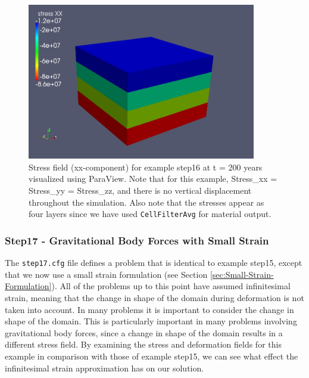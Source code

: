 \begin{figure}
\begin{centering}
\includegraphics[width=10cm]{tutorials/3dhex8/figs/step16-stress_xx-t200}
\par\end{centering}

\caption{Stress field (xx-component) for example step16 at t = 200 years visualized
using ParaView. Note that for this example, Stress\_xx = Stress\_yy
= Stress\_zz, and there is no vertical displacement throughout the
simulation. Also note that the stresses appear as four layers since
we have used \texttt{CellFilterAvg} for material output.\label{fig:step16-stress_xx-t200}}
\end{figure}



\subsubsection{Step17 - Gravitational Body Forces with Small Strain}

The \texttt{step17.cfg} file defines a problem that is identical to
example step15, except that we now use a small strain formulation
(see Section \ref{sec:Small-Strain-Formulation}). All of the problems
up to this point have assumed infinitesimal strain, meaning that the
change in shape of the domain during deformation is not taken into
account. In many problems it is important to consider the change in
shape of the domain. This is particularly important in many problems
involving gravitational body forces, since a change in shape of the
domain results in a different stress field. By examining the stress
and deformation fields for this example in comparison with those of
example step15, we can see what effect the infinitesimal strain approximation
has on our solution.

